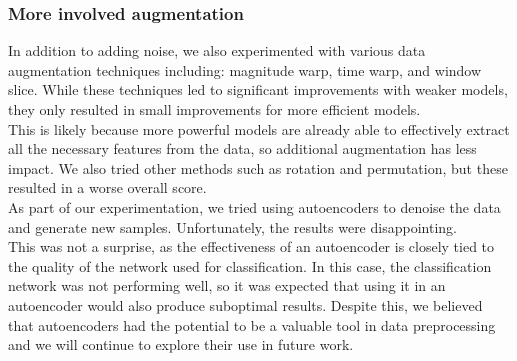 \documentclass[11pt]{article}
\begin{document}
\subsubsection{More involved augmentation}
In addition to adding noise, we also experimented with various data augmentation techniques including: magnitude warp, time warp, and window slice.
While these techniques led to significant improvements with weaker models, they only resulted in small improvements for more efficient models.\\
This is likely because more powerful models are already able to effectively extract all the necessary features from the data, so additional augmentation has less impact.
We also tried other methods such as rotation and permutation, but these resulted in a worse overall score.\\
As part of our experimentation, we tried using autoencoders to denoise the data and generate new samples. Unfortunately, the results were disappointing.\\
This was not a surprise, as the effectiveness of an autoencoder is closely tied to the quality of the network used for classification.
In this case, the classification network was not performing well, so it was expected that using it in an autoencoder would also produce suboptimal results.
Despite this, we believed that autoencoders had the potential to be a valuable tool in data preprocessing and we will continue to explore their use in future work.
\end{document}
